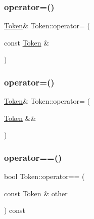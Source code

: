\mbox{\label{class_token_a302f8febd87a9cca349ba76dfd782548}} 
\subsubsection{\texorpdfstring{operator=()}{operator=()}\hspace{0.1cm}{\footnotesize\ttfamily [1/2]}}
{\footnotesize\ttfamily \hyperlink{class_token}{Token}\& Token\+::operator= (\begin{DoxyParamCaption}\item[{const \hyperlink{class_token}{Token} \&}]{ }\end{DoxyParamCaption})\hspace{0.3cm}{\ttfamily [default]}}

\mbox{\label{class_token_a4f45441b8d2dfe881c448377d4ca2cd4}} 
\subsubsection{\texorpdfstring{operator=()}{operator=()}\hspace{0.1cm}{\footnotesize\ttfamily [2/2]}}
{\footnotesize\ttfamily \hyperlink{class_token}{Token}\& Token\+::operator= (\begin{DoxyParamCaption}\item[{\hyperlink{class_token}{Token} \&\&}]{ }\end{DoxyParamCaption})\hspace{0.3cm}{\ttfamily [default]}}

\mbox{\label{class_token_a20c14983ac6c11ffb89135e2cd91169f}} 
\subsubsection{\texorpdfstring{operator==()}{operator==()}}
{\footnotesize\ttfamily bool Token\+::operator== (\begin{DoxyParamCaption}\item[{const \hyperlink{class_token}{Token} \&}]{other }\end{DoxyParamCaption}) const}

\mbox{\label{class_token_a50f3ddd1f75c6ae38e0156dd16796a9e}} 
